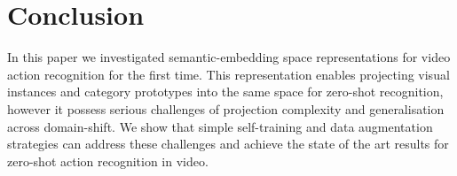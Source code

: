 \documentclass{article}
\begin{document}
\vspace{-0.1cm}
\section{Conclusion}
In this paper we investigated semantic-embedding space representations for video action recognition for the first time. This representation enables projecting visual instances and category prototypes into the same space for zero-shot recognition, however it possess serious challenges of projection complexity and generalisation across domain-shift. We show that simple self-training and data augmentation strategies can address these challenges and achieve the state of the art results for zero-shot action recognition in video.



\end{document}
